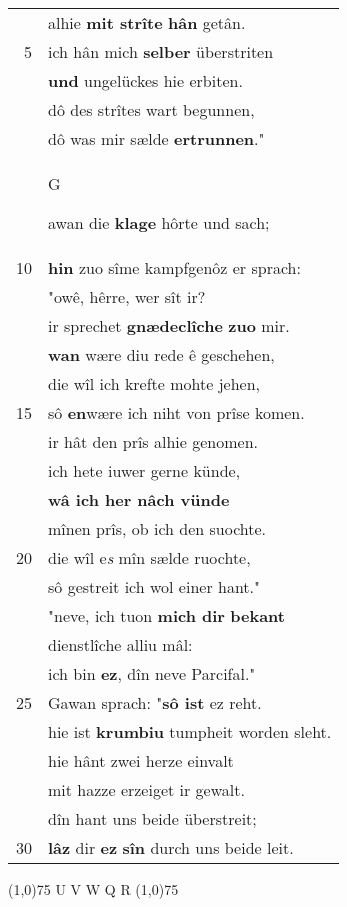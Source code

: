 \documentclass[8pt,a4paper,notitlepage]{article}
\begin{document}
\begin{table}[ht]
\begin{minipage}[t]{0.5\linewidth}
\begin{tabular}{rl}
 & alhie \textbf{mit strîte} \textbf{hân} getân.\\ 
5 & ich hân mich \textbf{selber} überstriten\\ 
 & \textbf{und} ungelückes hie erbiten.\\ 
 & dô des strîtes wart begunnen,\\ 
 & dô was mir sælde \textbf{ertrunnen}."\\ 
 & \begin{large}G\end{large}awan die \textbf{klage} hôrte und sach;\\ 
10 & \textbf{hin} zuo sîme kampfgenôz er sprach:\\ 
 & "owê, hêrre, wer sît ir?\\ 
 & ir sprechet \textbf{gnædeclîche} \textbf{zuo} mir.\\ 
 & \textbf{wan} wære diu rede ê geschehen,\\ 
 & die wîl ich krefte mohte jehen,\\ 
15 & sô \textbf{en}wære ich niht von prîse komen.\\ 
 & ir hât den prîs alhie genomen.\\ 
 & ich hete iuwer gerne künde,\\ 
 & \textbf{wâ ich her nâch vünde}\\ 
 & mînen prîs, ob ich den suochte.\\ 
20 & die wîl e\textit{s} mîn sælde ruochte,\\ 
 & sô gestreit ich wol einer hant."\\ 
 & "neve, ich tuon \textbf{mich dir} \textbf{bekant}\\ 
 & dienstlîche alliu mâl:\\ 
 & ich bin \textbf{ez}, dîn neve Parcifal."\\ 
25 & Gawan sprach: "\textbf{sô ist} ez reht.\\ 
 & hie ist \textbf{krumbiu} tumpheit worden sleht.\\ 
 & hie hânt zwei herze einvalt\\ 
 & mit hazze erzeiget ir gewalt.\\ 
 & dîn hant uns beide überstreit;\\ 
30 & \textbf{lâz} dir \textbf{ez} \textbf{sîn} durch uns beide leit.\\ 
\end{tabular}
\scriptsize
\line(1,0){75} \newline
U V W Q R \newline
\line(1,0){75} \newline

\end{minipage}
\end{table}
\end{document}
